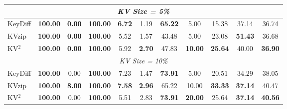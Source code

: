 \documentclass[11pt]{article}
\begin{document}
\begin{table}[htbp]
\begin{tabular}{l|ccc|cccc|c|c|c}
\midrule
\multicolumn{11}{c}{\textit{KV Size = 5\%}} \\
\midrule

KeyDiff
    & \textbf{100.00} & \textbf{0.00} & \textbf{100.00}
    & \textbf{6.72} & 1.19 & \textbf{65.22} & 5.00
    & 15.38
    & 37.14
    & 36.74 \\

KVzip
    & \textbf{100.00} & \textbf{0.00} & \textbf{100.00}
    & 5.52 & 1.57 & 43.48 & 5.00
    & 23.08
    & \textbf{51.43}
    & 36.68 \\

KV$^2$
    & \textbf{100.00} & \textbf{0.00} & \textbf{100.00}
    & 5.92 & \textbf{2.70} & 47.83 & \textbf{10.00}
    & \textbf{25.64}
    & 40.00
    & \textbf{36.90} \\

\midrule
\multicolumn{11}{c}{\textit{KV Size = 10\%}} \\
\midrule

KeyDiff
    & \textbf{100.00} & 0.00 & \textbf{100.00}
    & 7.23 & 1.47 & \textbf{73.91} & 5.00
    & 20.51
    & 34.29
    & 38.05 \\

KVzip
    & \textbf{100.00} & \textbf{8.00} & \textbf{100.00}
    & \textbf{7.58} & \textbf{2.96} & 65.22 & 10.00
    & \textbf{33.33}
    & \textbf{37.14}
    & 40.47 \\

KV$^2$
    & \textbf{100.00} & 0.00 & \textbf{100.00}
    & 5.51 & 2.83 & \textbf{73.91} & \textbf{20.00}
    & 25.64
    & \textbf{37.14}
    & \textbf{40.56} \\

\bottomrule
\end{tabular}

\end{table}

\end{document}

